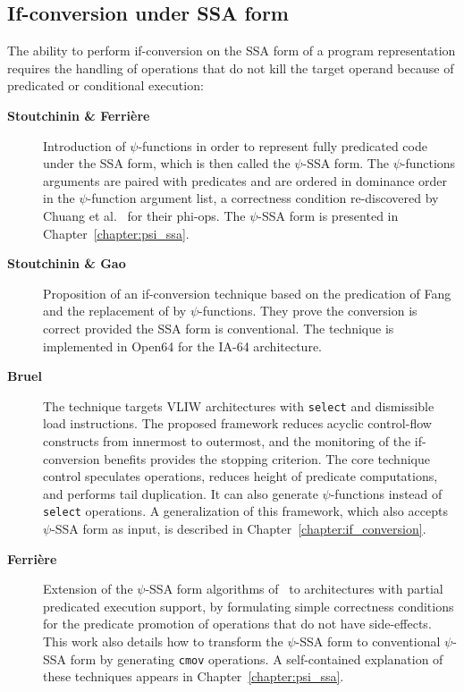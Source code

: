 \subsection{If-conversion under SSA form}

The ability to perform if-conversion on the SSA form of a program representation
requires the handling of operations that do not kill the target operand because
of predicated or conditional execution: \begin{description}

\item[\textbf{Stoutchinin \& Ferri\`ere~\cite{Stoutchinin:2001:MICRO}}] Introduction of
$\psi$-functions in order to represent fully predicated code under the SSA form,
which is then called the $\psi$-SSA form.  The $\psi$-functions arguments are
paired with predicates and are ordered in dominance order in the $\psi$-function
argument list, a correctness condition re-discovered by Chuang et al.~\cite{Chuang:2003:CGO} for their phi-ops.
The $\psi$-SSA form is presented in Chapter~\ref{chapter:psi_ssa}.

\item[\textbf{Stoutchinin \& Gao~\cite{Stoutchinin:2004:EuroPar}}] Proposition of an
if-conversion technique based on the predication of Fang~\cite{Fang:1996:LCPC}
and the replacement of \phifuns by $\psi$-functions. They prove the
conversion is correct provided the SSA form is conventional. The technique is
implemented in Open64 for the IA-64 architecture.

\item[\textbf{Bruel~\cite{Bruel:2006:ODES}}] The technique targets VLIW architectures with \texttt{select} and
dismissible load instructions. The proposed framework reduces acyclic
control-flow constructs from innermost to outermost, and the monitoring of the
if-conversion benefits provides the stopping criterion. The core technique
control speculates operations, reduces height of predicate computations, and
performs tail duplication. It can also generate $\psi$-functions instead of
\texttt{select} operations. A generalization of this framework, which also accepts
$\psi$-SSA form as input, is described in Chapter~\ref{chapter:if_conversion}.

\item[\textbf{Ferri\`ere~\cite{Ferriere:2007:SCOPES}}] Extension of the $\psi$-SSA form
algorithms of~\cite{Stoutchinin:2001:MICRO} to architectures with partial
predicated execution support, by formulating simple correctness conditions for
the predicate promotion of operations that do not have side-effects. This work
also details how to transform the $\psi$-SSA form to conventional $\psi$-SSA
form by generating \texttt{cmov} operations.
A self-contained explanation of these techniques appears in Chapter~\ref{chapter:psi_ssa}.

\end{description}

